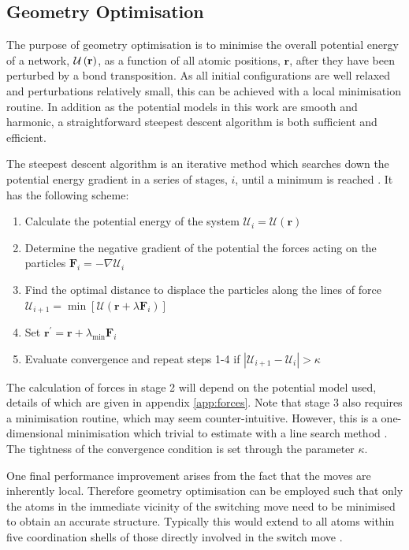 \subsection{Geometry Optimisation}
\label{s:geomopt}

The purpose of geometry optimisation is to minimise the overall potential energy of a network, $\mathcal{U}\left(\mathbf{r}\right)$, as a function of all atomic positions, $\mathbf{r}$, after they have been perturbed \eg{} by a bond transposition.
As all initial configurations are well relaxed and perturbations relatively small, this can be achieved with a local minimisation routine.
In addition as the potential models in this work are smooth and harmonic, a straightforward steepest descent algorithm is both sufficient and efficient.

The steepest descent algorithm is an iterative method which searches down the potential energy gradient in a series of stages, $i$, until a minimum is reached \cite{Nocedal2006}.
It has the following scheme:
\begin{enumerate}
	\item Calculate the potential energy of the system $\mathcal{U}_i=\mathcal{U}\left(\mathbf{r}\right)$
	\item Determine the negative gradient of the potential \ie{} the forces acting on the particles $\mathbf{F}_i=-\nabla \mathcal{U}_i$ 
	\item Find the optimal distance to displace the particles along the lines of force $\mathcal{U}_{i+1}=\min \left[\mathcal{U}\left(\mathbf{r}+\lambda \mathbf{F}_i\right)\right]$
	\item Set $\mathbf{r}^{\prime}=\mathbf{r}+\lambda_{\text{min}} \mathbf{F}_i$
	\item Evaluate convergence and repeat steps 1-4 if $\left|\mathcal{U}_{i+1}-\mathcal{U}_i\right|>\kappa$
\end{enumerate}
The calculation of forces in stage 2 will depend on the potential model used, details of which are given in appendix \ref{app:forces}.
Note that stage 3 also requires a minimisation routine, which may seem counter\--intuitive. 
However, this is a one\--dimensional minimisation which trivial to estimate with a line search method .
The tightness of the convergence condition is set through the parameter $\kappa$.

One final performance improvement arises from the fact that the \mc{} moves are inherently local.
Therefore geometry optimisation can be employed such that only the atoms in the immediate vicinity of the switching move need to be minimised to obtain an accurate structure.
Typically this would extend to all atoms within five coordination shells of those directly involved in the switch move \cite{Mousseau2001}.

